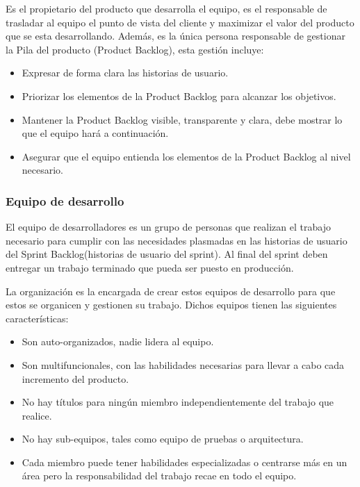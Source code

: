 Es el propietario del producto que desarrolla el equipo, es el responsable de trasladar al equipo el punto de vista del cliente y maximizar
el valor del producto que se esta desarrollando. Además, es la única persona responsable de gestionar la Pila del producto (Product Backlog), 
esta gestión incluye:

\begin{itemize}
	\item Expresar de forma clara las historias de usuario.
	\item Priorizar los elementos de la Product Backlog para alcanzar los objetivos.
	\item Mantener la Product Backlog visible, transparente y clara, debe mostrar lo que el equipo hará a continuación.
	\item Asegurar que el equipo entienda los elementos de la Product Backlog al nivel necesario.
\end{itemize}

\subsubsection{Equipo de desarrollo}

El equipo de desarrolladores es un grupo de personas que realizan el trabajo necesario para cumplir con las
necesidades plasmadas en las historias de usuario del Sprint Backlog(historias de usuario del sprint). Al final 
del sprint deben entregar un trabajo terminado que pueda ser puesto en producción.

La organización es la encargada de crear estos equipos de desarrollo para que estos se organicen y gestionen 
su trabajo. Dichos equipos tienen las siguientes características:

\begin{itemize}
	\item Son auto-organizados, nadie lidera al equipo.
	\item Son multifuncionales, con las habilidades necesarias para llevar a cabo cada incremento del producto.
	\item No hay títulos para ningún miembro independientemente del trabajo que realice.
	\item No hay sub-equipos, tales como equipo de pruebas o arquitectura.
	\item Cada miembro puede tener habilidades especializadas o centrarse más en un área pero la responsabilidad
	del trabajo recae en todo el equipo.
\end{itemize}

